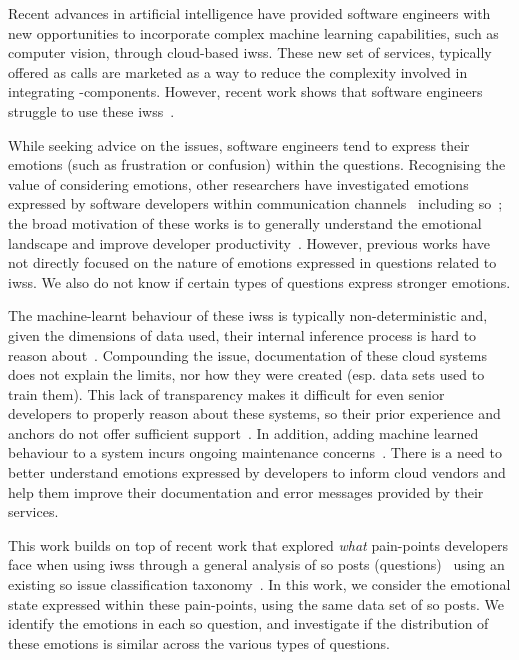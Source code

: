 Recent advances in artificial intelligence have provided software engineers with new opportunities to incorporate complex machine learning capabilities, such as computer vision, through cloud-based \glspl{iws}. These new set of services, typically offered as  calls are marketed as a way to reduce the complexity involved in integrating -components. However, recent work shows that software engineers struggle to use these \glspl{iws}~\citep{Cummaudo:2020icse}. 

While seeking advice on the issues, software engineers tend to express their emotions (such as frustration or confusion) within the questions. Recognising the value of considering emotions, other researchers have investigated emotions expressed by software developers within communication channels~\citep{ortu2016} including \gls{so}~\citep{novielli2018, calefato2018}; the broad motivation of these works is to generally understand the emotional landscape and improve developer productivity~\citep{murgia2014, ortu2016, gachechiladze2017}. However, previous works have not directly focused on the nature of emotions expressed in questions related to \glspl{iws}. We also do not know if certain types of questions express stronger emotions.

The machine-learnt behaviour of these \glspl{iws} is typically non-deterministic and, given the dimensions of data used, their internal inference process is hard to reason about~\citep{Cummaudo:2019icsme}. Compounding the issue, documentation of these cloud systems does not explain the limits, nor how they were created (esp. data sets used to train them). This lack of transparency makes it difficult for even senior developers to properly reason about these systems, so their prior experience and anchors do not offer sufficient support~\citep{Cummaudo:2020icse}. In addition, adding machine learned behaviour to a system incurs ongoing maintenance concerns~\citep{Sculley2015}. There is a need to better understand emotions expressed by developers to inform cloud vendors and help them improve their documentation and error messages provided by their services.

This work builds on top of recent work that explored \textit{what} pain-points developers face when using \glspl{iws} through a general analysis of \SEMNumPostsFromSO{} \gls{so} posts (questions)~\citep{Cummaudo:2020icse} using an existing \gls{so} issue classification taxonomy~\citep{Beyer:2018fm}. In this work, we consider the emotional state expressed within these pain-points, using the same data set of \SEMNumPostsFromSO{} \gls{so} posts. We identify the emotions in each \gls{so} question, and investigate if the distribution of these emotions is similar across the various types of questions.

